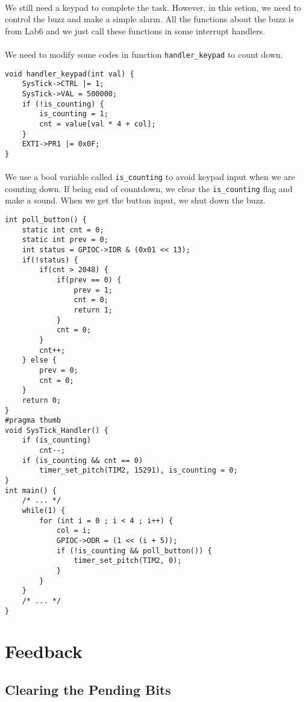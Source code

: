 \paragraph{}
We still need a keypad to complete the task. However, in this setion, we need to control the buzz and make a simple alarm. All the functions about the buzz is from Lab6 and we just call these functions in some interrupt handlers.
\paragraph{}
We need to modify some codes in function \texttt{handler\_keypad} to count down.
\begin{lstlisting}
void handler_keypad(int val) {
    SysTick->CTRL |= 1;
    SysTick->VAL = 500000;
    if (!is_counting) {
        is_counting = 1;
        cnt = value[val * 4 + col];
    }
    EXTI->PR1 |= 0x0F;
}
\end{lstlisting}
\paragraph{}
We use a bool variable called \texttt{is\_counting} to avoid keypad input when we are counting down. If being end of countdown, we clear the \texttt{is\_counting} flag and make a sound. When we get the button input, we shut down the buzz.
\begin{lstlisting}
int poll_button() {
	static int cnt = 0;
	static int prev = 0;
	int status = GPIOC->IDR & (0x01 << 13);
	if(!status) {
		if(cnt > 2048) {
			if(prev == 0) {
				prev = 1;
				cnt = 0;
				return 1;
			}
			cnt = 0;
		}
		cnt++;
	} else {
		prev = 0;
		cnt = 0;
	}
	return 0;
}
#pragma thumb
void SysTick_Handler() {
    if (is_counting)
        cnt--;
    if (is_counting && cnt == 0)
        timer_set_pitch(TIM2, 15291), is_counting = 0;
}
int main() {
    /* ... */
    while(1) {
        for (int i = 0 ; i < 4 ; i++) {
            col = i;
            GPIOC->ODR = (1 << (i + 5));
            if (!is_counting && poll_button()) {
                timer_set_pitch(TIM2, 0);
            }
        }
    }
    /* ... */
}
\end{lstlisting}
\section{Feedback}
\subsection{Clearing the Pending Bits}
